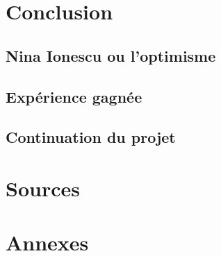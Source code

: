 \documentclass[11pt]{article}
\begin{document}
\section{Conclusion}
\subsection{Nina Ionescu ou l'optimisme}
\subsection{Expérience gagnée}
\subsection{Continuation du projet}

\section{Sources}
\section{Annexes}%
\begin{lstlisting}[language=JavaScript]

\end{lstlisting} 
\end{document}

